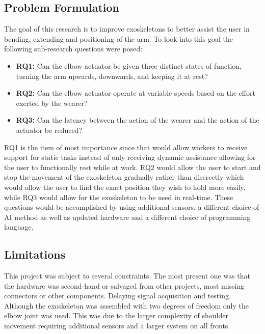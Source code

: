 \subsection{Problem Formulation}
The goal of this research is to improve exoskeletons to better assist the user in bending, extending and positioning of the arm.
To look into this goal the following sub-research questions were posed:
\begin{itemize}
        
    \item \textbf{RQ1:} Can the elbow actuator be given three distinct states of function, turning the arm upwards, downwards, and keeping it at rest?

    \item \textbf{RQ2:} Can the elbow actuator operate at variable speeds based on the effort exerted by the wearer?

    \item \textbf{RQ3:} Can the latency between the action of the wearer and the action of the actuator be reduced?

\end{itemize}
RQ1 is the item of most importance since that would allow workers to receive support for static tasks instead of only receiving dynamic
assistance allowing for the user to functionally rest while at work. RQ2 would allow the user to start and stop the
movement of the exoskeleton gradually rather than discreetly which would allow the user to find the exact position they
wish to hold more easily, while RQ3 would allow for the exoskeleton to be used in real-time. These questions would be
accomplished by using additional sensors, a different choice of AI method as well as updated hardware and a different
choice of programming language.\newline


\subsection{Limitations}
This project was subject to several constraints. 
The most present one was that the hardware was second-hand or salvaged from other projects, most missing connectors or other components.
Delaying signal acquisition and testing.
Although the exoskeleton was assembled with two degrees of freedom only the elbow joint was used.
This was due to the larger complexity of shoulder movement requiring additional sensors and a larger system on all
fronts.
